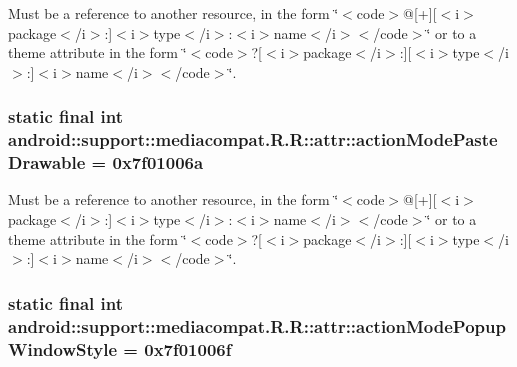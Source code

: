 Must be a reference to another resource, in the form \char`\"{}$<$code$>$@\mbox{[}+\mbox{]}\mbox{[}$<$i$>$package$<$/i$>$:\mbox{]}$<$i$>$type$<$/i$>$:$<$i$>$name$<$/i$>$$<$/code$>$\char`\"{} or to a theme attribute in the form \char`\"{}$<$code$>$?\mbox{[}$<$i$>$package$<$/i$>$:\mbox{]}\mbox{[}$<$i$>$type$<$/i$>$:\mbox{]}$<$i$>$name$<$/i$>$$<$/code$>$\char`\"{}. \hypertarget{classandroid_1_1support_1_1mediacompat_1_1_r_1_1attr_0224ff9db06ac25579709a50634cc2c7}{
\subsubsection[{actionModePasteDrawable}]{\setlength{\rightskip}{0pt plus 5cm}static final int android::support::mediacompat.R.R::attr::actionModePasteDrawable = 0x7f01006a}}
\label{classandroid_1_1support_1_1mediacompat_1_1_r_1_1attr_0224ff9db06ac25579709a50634cc2c7}


Must be a reference to another resource, in the form \char`\"{}$<$code$>$@\mbox{[}+\mbox{]}\mbox{[}$<$i$>$package$<$/i$>$:\mbox{]}$<$i$>$type$<$/i$>$:$<$i$>$name$<$/i$>$$<$/code$>$\char`\"{} or to a theme attribute in the form \char`\"{}$<$code$>$?\mbox{[}$<$i$>$package$<$/i$>$:\mbox{]}\mbox{[}$<$i$>$type$<$/i$>$:\mbox{]}$<$i$>$name$<$/i$>$$<$/code$>$\char`\"{}. \hypertarget{classandroid_1_1support_1_1mediacompat_1_1_r_1_1attr_40aef4bde61a759bbd27285d91d9abb0}{
\subsubsection[{actionModePopupWindowStyle}]{\setlength{\rightskip}{0pt plus 5cm}static final int android::support::mediacompat.R.R::attr::actionModePopupWindowStyle = 0x7f01006f}}
\label{classandroid_1_1support_1_1mediacompat_1_1_r_1_1attr_40aef4bde61a759bbd27285d91d9abb0}


